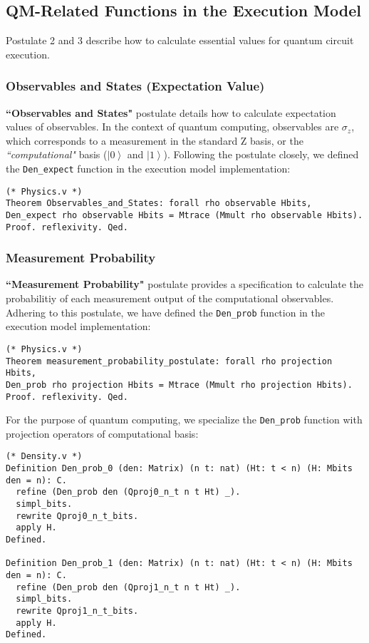 \documentclass[10pt,a4paper]{article}
\newcommand{\<}{\langle}
\renewcommand{\>}{\rangle}
\newcommand{\ket}[1]{\left\vert #1 \right\>}
\begin{document}
\subsection{QM-Related Functions in the Execution Model}

Postulate 2 and 3 describe how to calculate essential values for quantum
circuit execution.

\subsubsection{Observables and States (Expectation Value)}

\textbf{``Observables and States"} postulate details how to calculate
expectation values of observables. In the context of quantum computing,
observables are $\sigma_z$, which corresponds to a measurement in the
standard Z basis, or the \textit{``computational"} basis ($\ket{0}$ and
$\ket{1}$).  Following the postulate closely, we defined the
\texttt{Den\_expect} function in the execution model implementation:

\begin{lstlisting}
(* Physics.v *)
Theorem Observables_and_States: forall rho observable Hbits,
Den_expect rho observable Hbits = Mtrace (Mmult rho observable Hbits).
Proof. reflexivity. Qed.
\end{lstlisting}

\subsubsection{Measurement Probability}

\textbf{``Measurement Probability"} postulate provides a specification to calculate
the probabilitiy of each measurement output of the computational observables.
Adhering to this postulate, we have defined the \texttt{Den\_prob} function in
the execution model implementation:

\begin{lstlisting}
(* Physics.v *)
Theorem measurement_probability_postulate: forall rho projection Hbits,
Den_prob rho projection Hbits = Mtrace (Mmult rho projection Hbits).
Proof. reflexivity. Qed.
\end{lstlisting}

For the purpose of quantum computing, we specialize the \texttt{Den\_prob} function with
projection operators of computational basis:

\begin{lstlisting}
(* Density.v *)
Definition Den_prob_0 (den: Matrix) (n t: nat) (Ht: t < n) (H: Mbits den = n): C.
  refine (Den_prob den (Qproj0_n_t n t Ht) _).
  simpl_bits.
  rewrite Qproj0_n_t_bits.
  apply H.
Defined.

Definition Den_prob_1 (den: Matrix) (n t: nat) (Ht: t < n) (H: Mbits den = n): C.
  refine (Den_prob den (Qproj1_n_t n t Ht) _).
  simpl_bits.
  rewrite Qproj1_n_t_bits.
  apply H.
Defined.
\end{lstlisting}
\end{document}
